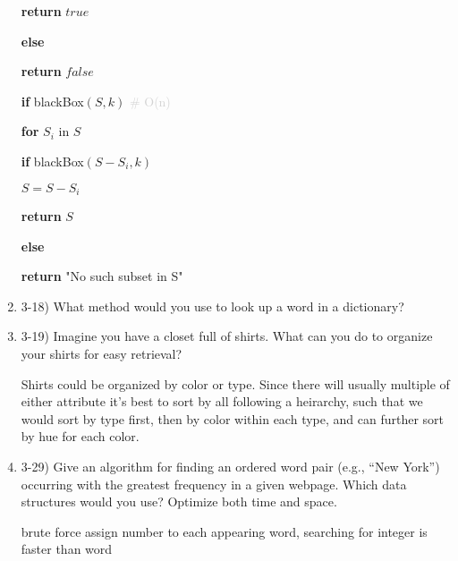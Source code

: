 \documentclass{article}
\begin{document}
\begin{enumerate}
{\begin{minipage}{0.8\textwidth}
    \quad \quad \textbf{return} $true$
    
    \quad \textbf{else}
        
    \quad \quad \textbf{return} $false$

    \textbf{if} blackBox$(S, k)$ \textcolor{lightgray}{ \# O(n)}
    
    \quad \textbf{for} $S_i$ in $S$

    \quad \quad \textbf{if} blackBox$(S - S_i, k)$

    \quad \quad \quad $S = S - S_i$

    \quad \textbf{return} $S$

    \textbf{else}

    \quad \textbf{return} "No such subset in S"

    \end{minipage}
    }

    \item 3-18) What method would you use to look up a word in a dictionary?
    
    
    
    \item 3-19) Imagine you have a closet full of shirts. What can you do to organize your shirts for easy retrieval?
    
    Shirts could be organized by color or type. Since there will usually multiple of either attribute it's best to sort by all following a heirarchy, such that we would sort by type first, then by color within each type, and can further sort by hue for each color.
    
    \item 3-29) Give an algorithm for finding an ordered word pair (e.g., “New York”) occurring with the greatest frequency in a given webpage. Which data structures would you use? Optimize both time and space. 

    brute force
    assign number to each appearing word, searching for integer is faster than word



\end{enumerate}
\end{document}
